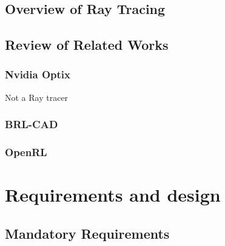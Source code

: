 \documentclass{article}
\begin{document}
	\subsection{Overview of Ray Tracing}
	\subsection{Review of Related Works}
	\subsubsection{Nvidia Optix} Not a Ray tracer
	\subsubsection{BRL-CAD}
	\subsubsection{OpenRL}
	
	\section{Requirements and design}
	
	
	\subsection{Mandatory Requirements}
	
\end{document}
